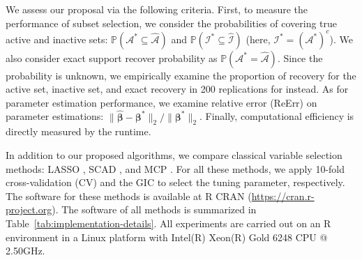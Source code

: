 We assess our proposal via the following criteria.
First, to measure the performance of subset selection,
we consider the probabilities of covering true active and inactive sets: $\mathbb{P}(\mathcal{A}^* \subseteq \hat{\mathcal{A}})$ and
$\mathbb{P}(\mathcal{I}^* \subseteq \hat{\mathcal{I}})$ (here, $\mathcal{I}^* = (\mathcal{A}^*)^c$).
We also consider exact support recover probability as $\mathbb{P}(\mathcal{A}^* = \hat{\mathcal{A}})$.
Since the probability is unknown, we empirically examine the proportion of recovery for the active set, inactive set, and exact recovery in 200 replications for instead.
As for parameter estimation performance, we examine relative error (ReErr) on parameter estimations:
$\|\hat{\boldsymbol{\beta}}-\boldsymbol{\beta}^*\|_{2} /\|\boldsymbol{\beta}^*\|_{2}$.
Finally, computational efficiency is directly measured by the runtime.

In addition to our proposed algorithms, we compare classical variable selection methods: LASSO \citep{tibshirani1996regression}, SCAD \citep{fan2001variable}, and MCP \citep{zhang2010nearly}.
For all these methods, we apply 10-fold cross-validation (CV) and the GIC to select the tuning parameter, respectively.
The software for these methods is available at R CRAN (\url{https://cran.r-project.org}).
The software of all methods is summarized in Table~\ref{tab:implementation-details}.
All experiments are carried out on an R environment in a Linux platform with Intel(R) Xeon(R) Gold 6248 CPU @ 2.50GHz. 


